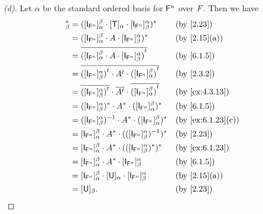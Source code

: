 \begin{proof}[(d)]
  Let \(\alpha\) be the standard ordered basis for \(\mathsf{F}^n\) over \(\mathit{F}\).
  Then we have
  \begin{align*}
    [\T]_{\beta}^* & = ([\IT[\vs{F}^n]]_{\alpha}^{\beta} \cdot [\T]_{\alpha} \cdot [\IT[\vs{F}^n]]_{\beta}^{\alpha})^*                         &  & \text{(by \cref{2.23})}         \\
                   & = ([\IT[\vs{F}^n]]_{\alpha}^{\beta} \cdot A \cdot [\IT[\vs{F}^n]]_{\beta}^{\alpha})^*                                     &  & \text{(by \cref{2.15}(a))}      \\
                   & = \conj{\tp{([\IT[\vs{F}^n]]_{\alpha}^{\beta} \cdot A \cdot [\IT[\vs{F}^n]]_{\beta}^{\alpha})}}                           &  & \text{(by \cref{6.1.5})}        \\
                   & = \conj{\tp{([\IT[\vs{F}^n]]_{\beta}^{\alpha})} \cdot \tp{A} \cdot \tp{([\IT[\vs{F}^n]]_{\alpha}^{\beta})}}               &  & \text{(by \cref{2.3.2})}        \\
                   & = \conj{\tp{([\IT[\vs{F}^n]]_{\beta}^{\alpha})}} \cdot \conj{\tp{A}} \cdot \conj{\tp{([\IT[\vs{F}^n]]_{\alpha}^{\beta})}} &  & \text{(by \cref{ex:4.3.13})}    \\
                   & = ([\IT[\vs{F}^n]]_{\beta}^{\alpha})^* \cdot A^* \cdot ([\IT[\vs{F}^n]]_{\alpha}^{\beta})^*                               &  & \text{(by \cref{6.1.5})}        \\
                   & = ([\IT[\vs{F}^n]]_{\beta}^{\alpha})^{-1} \cdot A^* \cdot ([\IT[\vs{F}^n]]_{\alpha}^{\beta})^*                            &  & \text{(by \cref{ex:6.1.23}(c))} \\
                   & = [\IT[\vs{F}^n]]_{\alpha}^{\beta} \cdot A^* \cdot (([\IT[\vs{F}^n]]_{\beta}^{\alpha})^{-1})^*                            &  & \text{(by \cref{2.23})}         \\
                   & = [\IT[\vs{F}^n]]_{\alpha}^{\beta} \cdot A^* \cdot (([\IT[\vs{F}^n]]_{\beta}^{\alpha})^*)^*                               &  & \text{(by \cref{ex:6.1.23})}    \\
                   & = [\IT[\vs{F}^n]]_{\alpha}^{\beta} \cdot A^* \cdot [\IT[\vs{F}^n]]_{\beta}^{\alpha}                                       &  & \text{(by \cref{6.1.5})}        \\
                   & = [\IT[\vs{F}^n]]_{\alpha}^{\beta} \cdot [\U]_{\alpha} \cdot [\IT[\vs{F}^n]]_{\beta}^{\alpha}                             &  & \text{(by \cref{2.15}(a))}      \\
                   & = [\U]_{\beta}.                                                                                                           &  & \text{(by \cref{2.23})}
  \end{align*}
\end{proof}

